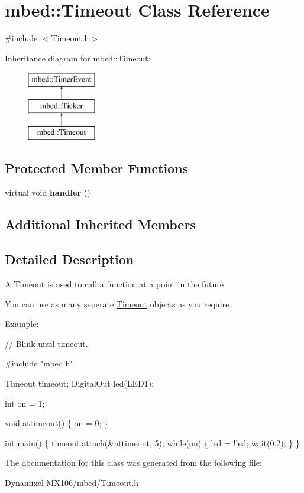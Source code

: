 \hypertarget{classmbed_1_1_timeout}{}\section{mbed\+:\+:Timeout Class Reference}
\label{classmbed_1_1_timeout}


{\ttfamily \#include $<$Timeout.\+h$>$}

Inheritance diagram for mbed\+:\+:Timeout\+:\begin{figure}[H]
\begin{center}
\leavevmode
\includegraphics[height=3.000000cm]{classmbed_1_1_timeout}
\end{center}
\end{figure}
\subsection*{Protected Member Functions}
\begin{DoxyCompactItemize}
\item 
virtual void {\bfseries handler} ()\hypertarget{classmbed_1_1_timeout_a2324f9b01f39fa36f4b799541a46112b}{}\label{classmbed_1_1_timeout_a2324f9b01f39fa36f4b799541a46112b}

\end{DoxyCompactItemize}
\subsection*{Additional Inherited Members}


\subsection{Detailed Description}
A \hyperlink{classmbed_1_1_timeout}{Timeout} is used to call a function at a point in the future

You can use as many seperate \hyperlink{classmbed_1_1_timeout}{Timeout} objects as you require.

Example\+: 
\begin{DoxyCode}
\textcolor{comment}{// Blink until timeout.}

\textcolor{preprocessor}{#include "mbed.h"}

Timeout timeout;
DigitalOut led(LED1);

\textcolor{keywordtype}{int} on = 1;

\textcolor{keywordtype}{void} attimeout() \{
    on = 0;
\}

\textcolor{keywordtype}{int} main() \{
    timeout.attach(&attimeout, 5);
    \textcolor{keywordflow}{while}(on) \{
        led = !led;
        wait(0.2);
    \}
\}
\end{DoxyCode}
 

The documentation for this class was generated from the following file\+:\begin{DoxyCompactItemize}
\item 
Dynamixel-\/\+M\+X106/mbed/Timeout.\+h\end{DoxyCompactItemize}
